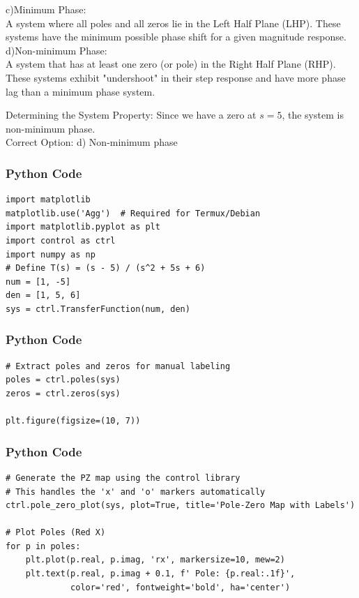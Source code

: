 \documentclass{beamer}
\begin{document}
\begin{frame}
c)Minimum Phase:\\
A system where all poles and all zeros lie in the Left Half Plane (LHP). These systems have the minimum possible phase shift for a given magnitude response.\\
d)Non-minimum Phase:\\
A system that has at least one zero (or pole) in the Right Half Plane (RHP). These systems exhibit "undershoot" in their step response and have more phase lag than a minimum phase system.\\
\end{frame}
\begin{frame}
Determining the System Property:
Since we have a zero at $s = 5$, the system is non-minimum phase.\\
Correct Option: d) Non-minimum phase
\end{frame}

\begin{frame}[fragile]
    \frametitle{Python Code}
    \begin{lstlisting}
import matplotlib
matplotlib.use('Agg')  # Required for Termux/Debian
import matplotlib.pyplot as plt
import control as ctrl
import numpy as np
# Define T(s) = (s - 5) / (s^2 + 5s + 6)
num = [1, -5]
den = [1, 5, 6]
sys = ctrl.TransferFunction(num, den)
\end{lstlisting}
\end{frame}

\begin{frame}[fragile]
\frametitle{Python Code}
\begin{lstlisting}
# Extract poles and zeros for manual labeling
poles = ctrl.poles(sys)
zeros = ctrl.zeros(sys)

plt.figure(figsize=(10, 7))
\end{lstlisting}
\end{frame}

\begin{frame}[fragile]
\frametitle{Python Code}
\begin{lstlisting}
# Generate the PZ map using the control library
# This handles the 'x' and 'o' markers automatically
ctrl.pole_zero_plot(sys, plot=True, title='Pole-Zero Map with Labels')

# Plot Poles (Red X)
for p in poles:
    plt.plot(p.real, p.imag, 'rx', markersize=10, mew=2)
    plt.text(p.real, p.imag + 0.1, f' Pole: {p.real:.1f}', 
             color='red', fontweight='bold', ha='center')
\end{lstlisting}
\end{frame}
\end{document}
